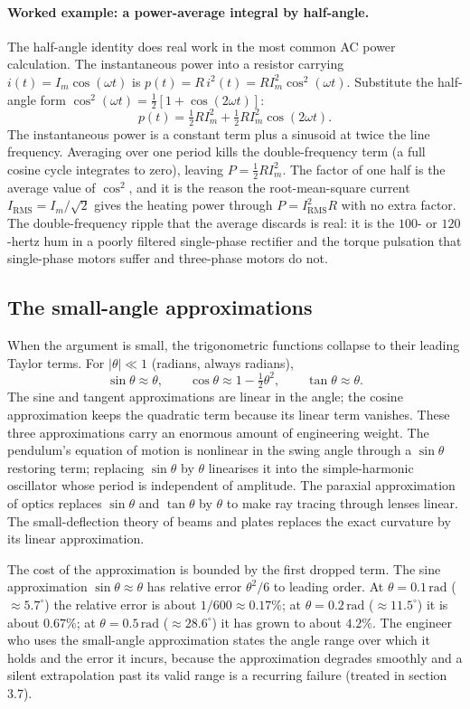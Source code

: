 \paragraph{Worked example: a power-average integral by half-angle.}
The half-angle identity does real work in the most common AC power
calculation. The instantaneous power into a resistor carrying
$i(t) = I_{m}\cos(\omega t)$ is $p(t) = R\,i^{2}(t) = R I_{m}^{2}
\cos^{2}(\omega t)$. Substitute the half-angle form $\cos^{2}(\omega
t) = \tfrac{1}{2}[1 + \cos(2\omega t)]$:
\[
p(t) = \tfrac{1}{2} R I_{m}^{2} + \tfrac{1}{2} R I_{m}^{2}\cos(2\omega t).
\]
The instantaneous power is a constant term plus a sinusoid at twice
the line frequency. Averaging over one period kills the
double-frequency term (a full cosine cycle integrates to zero),
leaving $P = \tfrac{1}{2} R I_{m}^{2}$. The factor of one half is the
average value of $\cos^{2}$, and it is the reason the root-mean-square
current $I_{\text{RMS}} = I_{m}/\sqrt{2}$ gives the heating power
through $P = I_{\text{RMS}}^{2} R$ with no extra factor. The
double-frequency ripple that the average discards is real: it is the
$100$- or $120$-hertz hum in a poorly filtered single-phase rectifier
and the torque pulsation that single-phase motors suffer and
three-phase motors do not.

\subsection{The small-angle approximations}

When the argument is small, the trigonometric functions collapse to
their leading Taylor terms. For $|\theta| \ll 1$ (radians, always
radians),
\[
\sin\theta \approx \theta, \qquad
\cos\theta \approx 1 - \tfrac{1}{2}\theta^{2}, \qquad
\tan\theta \approx \theta.
\]
The sine and tangent approximations are linear in the angle; the
cosine approximation keeps the quadratic term because its linear
term vanishes. These three approximations carry an enormous amount
of engineering weight. The pendulum's equation of motion is
nonlinear in the swing angle through a $\sin\theta$ restoring term;
replacing $\sin\theta$ by $\theta$ linearises it into the
simple-harmonic oscillator whose period is independent of amplitude.
The paraxial approximation of optics replaces $\sin\theta$ and
$\tan\theta$ by $\theta$ to make ray tracing through lenses linear.
The small-deflection theory of beams and plates replaces the exact
curvature by its linear approximation.

The cost of the approximation is bounded by the first dropped term.
The sine approximation $\sin\theta \approx \theta$ has relative error
$\theta^{2}/6$ to leading order. At $\theta = 0.1\,\text{rad}$
($\approx 5.7^{\circ}$) the relative error is about $1/600 \approx
0.17\%$; at $\theta = 0.2\,\text{rad}$ ($\approx 11.5^{\circ}$) it is
about $0.67\%$; at $\theta = 0.5\,\text{rad}$ ($\approx 28.6^{\circ}$)
it has grown to about $4.2\%$. The engineer who uses the small-angle
approximation states the angle range over which it holds and the
error it incurs, because the approximation degrades smoothly and a
silent extrapolation past its valid range is a recurring failure
(treated in section 3.7).

